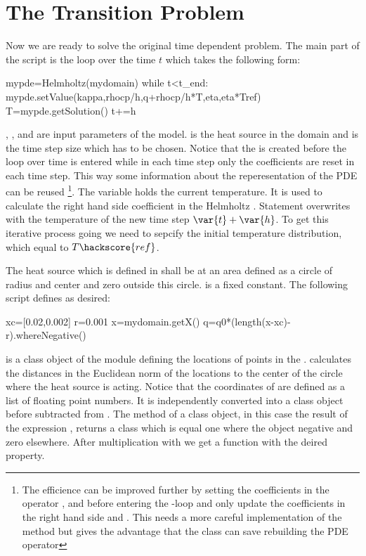 \section{The Transition Problem}
\label{DIFFUSION TRANS SEC}
Now we are ready to solve the original time dependent problem. The main 
part of the script is the loop over the time $t$ which takes the following form:
\begin{python}
mypde=Helmholtz(mydomain)
while t<t_end:
      mypde.setValue(kappa,rhocp/h,q+rhocp/h*T,eta,eta*Tref)
      T=mypde.getSolution()
      t+=h
\end{python}
, ,  and  are input parameters of the model.  is the heat source
in the domain and  is the time step size which has to be chosen. Notice that the 
is created before the loop over time is entered while in each time step only the coefficients
are reset in each time step. This way some information about the reperesentation of the PDE can be reused 
\footnote{The efficience can be improved further by setting the coefficients in the operator
,  and  before entering the -loop and only update the coefficients
in the right hand side  and . This needs a more careful implementation of the 
method but gives the advantage that the \LinearPDE class can save rebuilding the PDE operator}. The variable 
holds the current temperature. It is used to calculate the right hand side coefficient  in the
Helmholtz . Statement  overwrites  with the 
temperature of the new time step $\var{t}+\var{h}$. To get this iterative process going we need to sepcify the
initial temperature distribution, which equal to $T\hackscore{ref}$.

The heat source  which is defined in  shall be 
at an area defined as a circle of radius  and center  and zero outside this circle.
 is a fixed constant. The following script defines  as desired:  
\begin{python}
xc=[0.02,0.002]
r=0.001
x=mydomain.getX()
q=q0*(length(x-xc)-r).whereNegative()
\end{python}
 is a \Data class object of
the \escript module defining the locations of points in the \Domain {}. 
 calculates the distances in the Euclidean norm 
of the locations  to the center of the circle  where the heat source is acting.
Notice that the coordinates of  are defined as a list of floating point numbers. It is independently
converted into a \Data class object before subtracted from . The method  of
a \Data class object, in this case the result of the expression 
, returns a \Data class which is equal one where the object negative and
zero elsewhere. After multiplication with  we get a function with the deired property.

